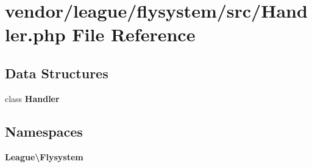 \section{vendor/league/flysystem/src/\+Handler.php File Reference}
\label{vendor_2league_2flysystem_2src_2_handler_8php}
\subsection*{Data Structures}
\begin{DoxyCompactItemize}
\item 
class {\bf Handler}
\end{DoxyCompactItemize}
\subsection*{Namespaces}
\begin{DoxyCompactItemize}
\item 
 {\bf League\textbackslash{}\+Flysystem}
\end{DoxyCompactItemize}
